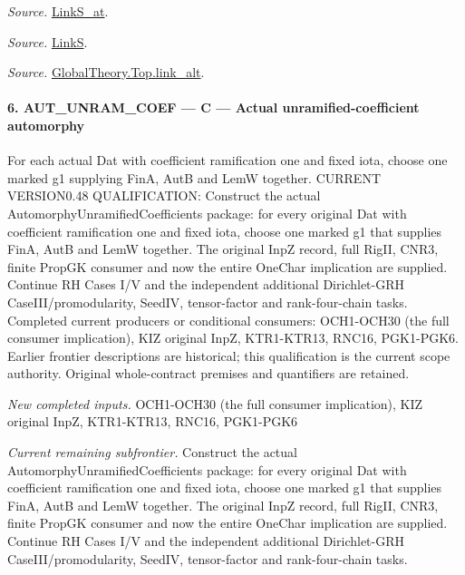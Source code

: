 \documentclass[11pt,a4paper]{article}
\numberwithin{equation}{section}
\theoremstyle{remark}\newtheorem{remark}[theorem]{Remark}
\begin{document}
\emph{Source.} \href{https://github.com/CocoSgt/riemann-hypothesis-lean/blob/7cbf7a0c32fca1badf05931879a37c3f8a2b03b4/src/Formalism/SharpRestriction/GlobalTheoremInputs.lean#L145-L149}{LinkS\_\allowbreak at}.

\emph{Source.} \href{https://github.com/CocoSgt/riemann-hypothesis-lean/blob/7cbf7a0c32fca1badf05931879a37c3f8a2b03b4/src/Formalism/SharpRestriction/GlobalTheoremInputs.lean#L152-L157}{LinkS}.

\emph{Source.} \href{https://github.com/CocoSgt/riemann-hypothesis-lean/blob/7cbf7a0c32fca1badf05931879a37c3f8a2b03b4/src/Development/AbelianVarietyTheory/Proofs/GlobalInterpolation/LinkAlt.lean#L16-L50}{GlobalTheory.Top.link\_\allowbreak alt}.



\paragraph{6. AUT\_\allowbreak UNRAM\_\allowbreak COEF — C — Actual unramified-coefficient automorphy}

For each actual Dat with coefficient ramification one and fixed iota, choose one marked g1 supplying FinA, AutB and LemW together. CURRENT VERSION0.48 QUALIFICATION: Construct the actual AutomorphyUnramifiedCoefficients package: for every original Dat with coefficient ramification one and fixed iota, choose one marked g1 that supplies FinA, AutB and LemW together. The original InpZ record, full RigII, CNR3, finite PropGK consumer and now the entire OneChar implication are supplied. Continue RH Cases I/V and the independent additional Dirichlet-GRH CaseIII/promodularity, SeedIV, tensor-factor and rank-four-chain tasks. Completed current producers or conditional consumers: OCH1-OCH30 (the full consumer implication), KIZ original InpZ, KTR1-KTR13, RNC16, PGK1-PGK6. Earlier frontier descriptions are historical; this qualification is the current scope authority. Original whole-contract premises and quantifiers are retained.

\emph{New completed inputs.} OCH1-OCH30 (the full consumer implication), KIZ original InpZ, KTR1-KTR13, RNC16, PGK1-PGK6

\emph{Current remaining subfrontier.} Construct the actual AutomorphyUnramifiedCoefficients package: for every original Dat with coefficient ramification one and fixed iota, choose one marked g1 that supplies FinA, AutB and LemW together. The original InpZ record, full RigII, CNR3, finite PropGK consumer and now the entire OneChar implication are supplied. Continue RH Cases I/V and the independent additional Dirichlet-GRH CaseIII/promodularity, SeedIV, tensor-factor and rank-four-chain tasks.
\end{document}
